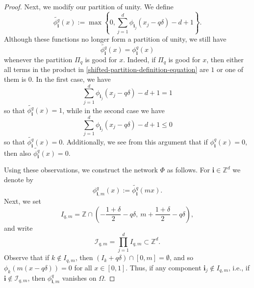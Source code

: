 \documentclass[twoside,11pt]{article}
\begin{document}
\begin{proof}
    Next, we modify our partition of unity. We define
    \begin{equation}\label{definition-of-tilde-phi}
        \widetilde{\phi^q_{\textbf{i}}}(x) := \max\left\{0,\sum_{j=1}^d \phi_{\textbf{i}_j}(x_j - q\delta) - d + 1\right\}.
    \end{equation}
    Although these functions no longer form a partition of unity, we still have
    \begin{equation}
        \widetilde{\phi^q_{\textbf{i}}}(x) = \phi^q_{\textbf{i}}(x)
    \end{equation}
    whenever the partition $\Pi_q$ is good for $x$. Indeed, if $\Pi_q$ is good for $x$, then either all terms in the product in \eqref{shifted-partition-definition-equation} are $1$ or one of them is $0$. In the first case, we have
    \begin{equation}
        \sum_{j=1}^d \phi_{\textbf{i}_j}(x_j - q\delta) - d + 1 = 1
    \end{equation}
    so that $\widetilde{\phi^q_{\textbf{i}}}(x) = 1$, while in the second case we have
    \begin{equation}
        \sum_{j=1}^d \phi_{\textbf{i}_j}(x_j - q\delta) - d + 1 \leq 0
    \end{equation}
    so that $\widetilde{\phi^q_{\textbf{i}}}(x) = 0$. Additionally, we see from this argument that if $\phi_{\textbf{i}}^q(x) = 0$, then also $\widetilde{\phi^q_{\textbf{i}}}(x) = 0$.

    Using these observations, we construct the network $\Phi$ as follows. For $\textbf{i}\in \mathbb{Z}^d$ we denote by
    \begin{equation}
        \phi^q_{\textbf{i},m}(x) := \widetilde{\phi^q_{\textbf{i}}}(mx).
    \end{equation}
    Next, we set
    \begin{equation}
        I_{q,m} = \mathbb{Z}\cap \left(-\frac{1+\delta}{2} - q\delta,~m + \frac{1+\delta}{2}-q\delta\right),
    \end{equation}
    and write
    \begin{equation}
        \mathcal{I}_{q,m} = \prod_{j=1}^d I_{q,m} \subset \mathbb{Z}^d.
    \end{equation}
    Observe that if $k\notin I_{q,m}$, then $(I_k + q\delta) \cap [0,m] = \emptyset$, and so $\phi_k(m(x - q\delta)) = 0$ for all $x\in [0,1]$. Thus, if any component $\textbf{i}_j \notin I_{q,m}$, i.e., if $\textbf{i}\notin \mathcal{I}_{q,m}$, then $\phi_{\textbf{i},m}^q$ vanishes on $\Omega$. 
    

\end{proof}
\end{document}

